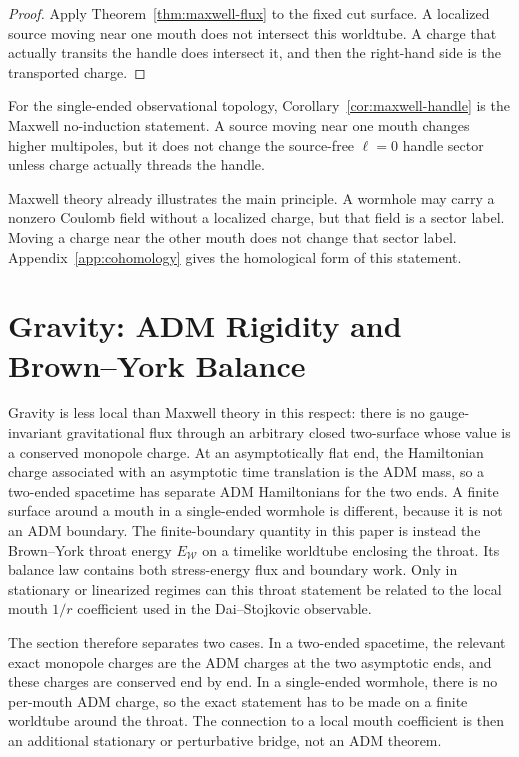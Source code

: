 \documentclass[aps,prd,10pt,onecolumn,nofootinbib,superscriptaddress,floatfix]{revtex4-2}
\begin{document}
\begin{proof}
Apply Theorem~\ref{thm:maxwell-flux} to the fixed cut surface.  A
localized source moving near one mouth does not intersect this worldtube.  A
charge that actually transits the handle does intersect it, and then the
right-hand side is the transported charge.
\end{proof}

For the single-ended observational topology, Corollary~\ref{cor:maxwell-handle}
is the Maxwell no-induction statement.  A source moving near one mouth changes
higher multipoles, but it does not change the source-free $\ell=0$ handle
sector unless charge actually threads the handle.

Maxwell theory already illustrates the main principle.  A wormhole may carry a
nonzero Coulomb field without a localized charge, but that field is a sector
label.  Moving a charge near the other mouth does not change that sector label.
Appendix~\ref{app:cohomology} gives the homological form of this statement.

\FloatBarrier

\section{Gravity: ADM Rigidity and Brown--York Balance}
\label{sec:gravity}

Gravity is less local than Maxwell theory in this respect: there is no
gauge-invariant gravitational flux through an arbitrary closed two-surface
whose value is a conserved monopole charge.  At an asymptotically flat end,
the Hamiltonian charge associated with an asymptotic time translation is the
ADM mass, so a two-ended spacetime has separate ADM Hamiltonians for the two
ends.  A finite surface around a mouth in a single-ended wormhole is different,
because it is not an ADM boundary.  The finite-boundary quantity in this paper
is instead the Brown--York throat energy $E_{\mathcal W}$ on a timelike
worldtube enclosing the throat.
Its balance law contains both stress-energy flux and boundary work.  Only in
stationary or linearized regimes can this throat statement be related to the
local mouth $1/r$ coefficient used in the Dai--Stojkovic observable.

The section therefore separates two cases.  In a two-ended spacetime, the
relevant exact monopole charges are the ADM charges at the two asymptotic
ends, and these charges are conserved end by end.  In a single-ended wormhole,
there is no per-mouth ADM charge, so the exact statement has to be made on a
finite worldtube around the throat.  The connection to a local mouth coefficient
is then an additional stationary or perturbative bridge, not an ADM theorem.
\end{document}
